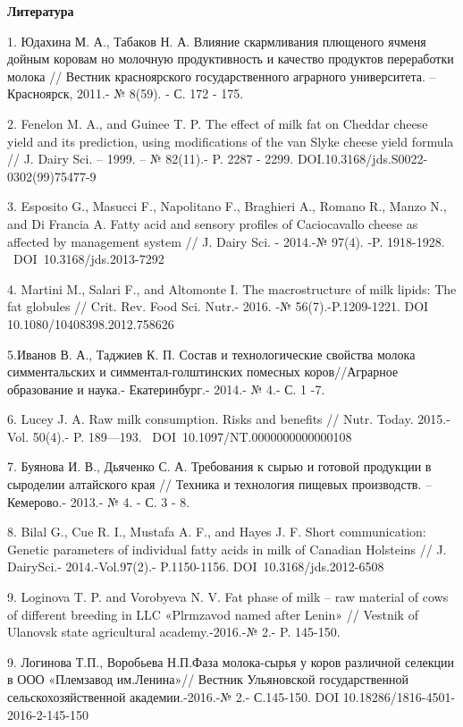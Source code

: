 {\bfseries Литература}

1. Юдахина М. А., Табаков Н. А. Влияние скармливания плющеного ячменя
дойным коровам но молочную продуктивность и качество продуктов
переработки молока // Вестник красноярского государственного аграрного
университета. -- Красноярск, 2011.- № 8(59). - С. 172 - 175.

2. Fenelon M. A., and Guinee T. P. The effect of milk fat on Cheddar
cheese yield and its prediction, using modifications of the van Slyke
cheese yield formula // J. Dairy Sci. -- 1999. -- № 82(11).- P. 2287 -
2299. DOI.10.3168/jds.S0022-0302(99)75477-9

3. Esposito G., Masucci F., Napolitano F., Braghieri A., Romano R.,
Manzo N., and Di Francia A. Fatty acid and sensory profiles of
Caciocavallo cheese as affected by management system // J. Dairy Sci. -
2014.-№ 97(4). -P. 1918-1928. ~DOI~10.3168/jds.2013-7292

4. Martini M., Salari F., and Altomonte I. The macrostructure of milk
lipids: The fat globules // Crit. Rev. Food Sci. Nutr.- 2016. -№
56(7).-P.1209-1221. DOI 10.1080/10408398.2012.758626

5.Иванов В. А., Таджиев К. П. Состав и технологические свойства молока
симментальских и симментал-голштинских помесных коров//Аграрное
образование и наука.- Екатеринбург.- 2014.- № 4.- С. 1 -7.

6. Lucey J. A. Raw milk consumption. Risks and benefits // Nutr. Today.
2015.-Vol. 50(4).- P. 189---193. ~DOI~10.1097/NT.0000000000000108

7. Буянова И. В., Дьяченко С. А. Требования к сырью и готовой продукции
в сыроделии алтайского края // Техника и технология пищевых производств.
--Кемерово.- 2013.- № 4. - С. 3 - 8.

8. Bilal G., Cue R. I., Mustafa A. F., and Hayes J. F. Short
communication: Genetic parameters of individual fatty acids in milk of
Canadian Holsteins // J. DairySci.- 2014.-Vol.97(2).- P.1150-1156.
DOI~10.3168/jds.2012-6508

9. Loginova T. P. and Vorobyeva N. V. Fat phase of milk -- raw material
of cows of different breeding in LLC «Plrmzavod named after Lenin» //
Vestnik of Ulanovsk state agricultural academy.-2016.-№ 2.- P. 145-150.

9. Логинова Т.П., Воробьева Н.П.Фаза молока-сырья у коров различной
селекции в ООО «Племзавод им.Ленина»// Вестник Ульяновской
государственной сельскохозяйственной академии.-2016.-№ 2.- С.145-150.
DOI 10.18286/1816-4501-2016-2-145-150

